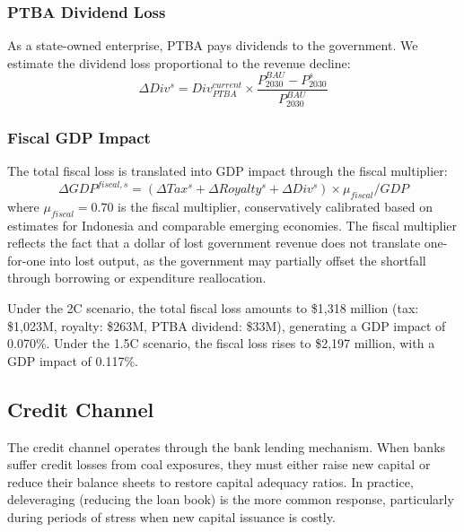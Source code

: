 \subsubsection{PTBA Dividend Loss}

As a state-owned enterprise, PTBA pays dividends to the government. We estimate the dividend loss proportional to the revenue decline:
\begin{equation}
\label{eq:dividend_loss}
\Delta Div^s = Div^{current}_{PTBA} \times \frac{P^{BAU}_{2030} - P^s_{2030}}{P^{BAU}_{2030}}
\end{equation}

\subsubsection{Fiscal GDP Impact}

The total fiscal loss is translated into GDP impact through the fiscal multiplier:
\begin{equation}
\label{eq:fiscal_gdp}
\Delta GDP^{fiscal,s} = \left(\Delta Tax^s + \Delta Royalty^s + \Delta Div^s\right) \times \mu_{fiscal} / GDP
\end{equation}
where $\mu_{fiscal} = 0.70$ is the fiscal multiplier, conservatively calibrated based on estimates for Indonesia and comparable emerging economies. The fiscal multiplier reflects the fact that a dollar of lost government revenue does not translate one-for-one into lost output, as the government may partially offset the shortfall through borrowing or expenditure reallocation.

Under the 2\textdegree C scenario, the total fiscal loss amounts to \$1,318 million (tax: \$1,023M, royalty: \$263M, PTBA dividend: \$33M), generating a GDP impact of 0.070\%. Under the 1.5\textdegree C scenario, the fiscal loss rises to \$2,197 million, with a GDP impact of 0.117\%.

\subsection{Credit Channel}
\label{subsec:credit_channel}

The credit channel operates through the bank lending mechanism. When banks suffer credit losses from coal exposures, they must either raise new capital or reduce their balance sheets to restore capital adequacy ratios. In practice, deleveraging (reducing the loan book) is the more common response, particularly during periods of stress when new capital issuance is costly.

